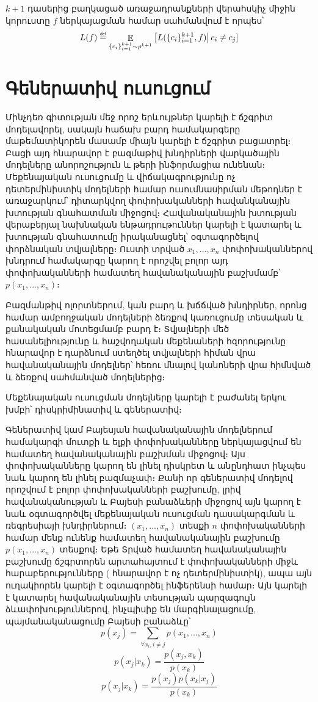 \documentclass[11pt]{article}
\DeclareMathOperator*{\E}{\mathbb{E}}
\newcommand\defeq{\mathrel{\overset{\makebox[0pt]{\mbox{\normalfont\tiny\sffamily def}}}{=}}}
\begin{document}
\begin{defination}
$k+1$ դասերից բաղկացած առաջադրանքների վերահսկիչ միջին կորուստը $f$ ներկայացման համար սահմանվում է որպես՝ 
$$L(f) \defeq \E_{\{c_i\}_{i=1}^{k+1} \sim \rho^{k+1}} \left [L (\{c_i\}_{i=1}^{k+1}, f)\right | c_i \neq c_j]$$

\end{defination}
\iffalse
\section*{\hfill Գեներատիվ ուսուցում \hfill} \noindent

{}


\par Մինչդեռ գիտության մեջ որոշ երևույթներ կարելի է ճշգրիտ մոդելավորել, սակայն հաճախ բարդ համակարգերը մաթեմատիկորեն մասամբ միայն կարելի է ճշգրիտ բացատրել։ Բացի այդ հնարավոր է բազմաթիվ խնդիրների վարկածային մոդելները անորոշություն և թերի ինֆորմացիա ունենան։ Մեքենայական ուսուցումը և վիճակագրությունը ոչ դետերմինիստիկ մոդելների համար ուսումնասիրման մեթոդներ է առաջարկում՝  դիտարկվող փոփոխականների հավանկանային խտության գնահատման միջոցով։ Հավանականային խտության վերաբերյալ նախնական ենթադրութուններ կարելի է կատարել և խտության գնահատումը իրականացնել՝ օգտագործելով փորձնական տվյալները։ Ուստի տրված $x_1, ..., x_n$ փոփոխականներով խնդրում համակարգը կարող է որոշվել բոլոր այդ փոփոխականների համատեղ հավանականային բաշխմամբ՝ $p  \left ( x_1, ..., x_n \right )$։
\par Բազմանթիվ ոլորտներում, կան բարդ և խճճված խնդիրներ, որոնց համար ամբողջական մոդելների ձեռքով կառուցումը  տեսական և քանակական մոտեցմամբ  բարդ է։ Տվյալների մեծ հասանելիությունը և հաշվողական մեքենաների հզորությունը հնարավոր է դարձնում ստեղծել տվյալների հիման վրա հավանականային մոդելներ՝ հեռու մնալով կանոների վրա հիմնված և ձեռքով սահմանված մոդելներից։ 

\par
Մեքենայական ուսուցման մոդելները կարելի է բաժանել երկու խմբի՝ դիսկրիմինատիվ և գեներատիվ։


Գեներատիվ կամ Բայեսյան հավանականային մոդելներում համակարգի մուտքի և ելքի փոփոխականները ներկայացվում են համատեղ հավանականային բաշխման միջոցով։ Այս փոփոխականները կարող են լինել դիսկրետ և անընդհատ ինչպես նաև կարող են լինել բազմաչափ։ Քանի որ գեներատիվ մոդելով որոշվում է բոլոր փոփոխականների բաշխումը, լրիվ  հավանականության և Բայեսի բանաձևերի միջոցով   այն կարող է նաև օգտագործվել մեքենայական ուսուցման դասակարգման և ռեգրեսիայի խնդիրներում։ $(x_1, ..., x_n)$ տեսքի $n$ փոփոխականների համար մենք ունենք համատեղ հավանականային բաշխումը $p(x_1, ..., x_n)$ տեսքով։ Եթե Տրված համատեղ հավանականային բաշխումը ճշգրտորեն արտահայտում է փոփոխականների միջև հարաբերությունները ( հնարավոր է ոչ դետերմինիստիկ), ապա այն ուղակիորեն կարելի է օգտագործել ինֆերենսի համար։  Այն կարելի է կատարել հավանականային տեսության պարզագույն ձևափոխություններով, ինչպիսիք են մարգինալացումը, պայմանականացումը Բայեսի բանաձևը՝
$$p(x_j) = \sum_{\forall x_i, i \neq j}{p(x_1, ..., x_n)}$$
$$p(x_j | x_k) = \frac {p(x_j, x_k)} {p(x_k)}$$
$$p(x_j | x_k) = \frac {p(x_j)p(x_k |x_j)} {p(x_k)}$$
\end{document}
